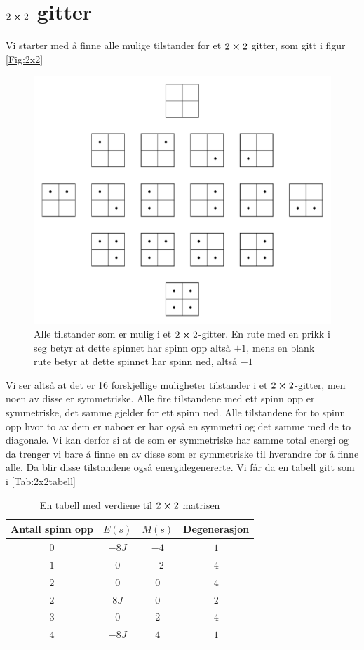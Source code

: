 \documentclass[reprint,english,notitlepage]{revtex4-2}  %
\begin{document}
\appendix
\section{$2\cross 2$ gitter} \label{A}
Vi starter med å finne alle mulige tilstander for et $2\cross 2$ gitter, som gitt i figur \autoref{Fig:2x2}
\begin{figure}[H]
	\includegraphics[scale=0.5]{Latice.pdf}
	\caption{Alle tilstander som er mulig i et $2\cross2$-gitter. En rute med en prikk i seg betyr at dette spinnet har spinn opp altså $+1$, mens en blank rute betyr at dette spinnet har spinn ned, altså $-1$}
	\label{Fig:2x2}
\end{figure}
Vi ser altså at det er 16 forskjellige muligheter tilstander i et $2\cross2$-gitter, men noen av disse er symmetriske. Alle fire tilstandene med ett spinn opp er symmetriske, det samme gjelder for ett spinn ned. Alle tilstandene for to spinn opp hvor to av dem er naboer er har også en symmetri og det samme med de to diagonale. Vi kan derfor si at de som er symmetriske har samme total energi og da trenger vi bare å finne en av disse som er symmetriske til hverandre for å finne alle. Da blir disse tilstandene også energidegenererte. Vi får da en tabell gitt som i \autoref{Tab:2x2tabell}
\begin{table}[H]
	\begin{tabular}{|c|c|c|c|} %
		\hline                    %
		Antall spinn opp & $E(s)$ & $M(s)$& Degenerasjon  \\
		\hline
		$0$ & $-8J$ & $-4$ & $1$ \\
		\hline
		$1$ & $0$ & $-2$ & 4\\
		\hline
		$2$ &$0$ &$0$ &$4$ \\\hline 
		$2$ &$8J$ &$0$&$2$ \\\hline 
		$3$&$0$&$2$&$4$ \\\hline 
		$4$&$-8J$&$4$&$1$ \\\hline 
	\end{tabular}
	\caption{En tabell med verdiene til $2\cross 2$ matrisen}
	\label{Tab:2x2tabell}
\end{table}
\end{document}
